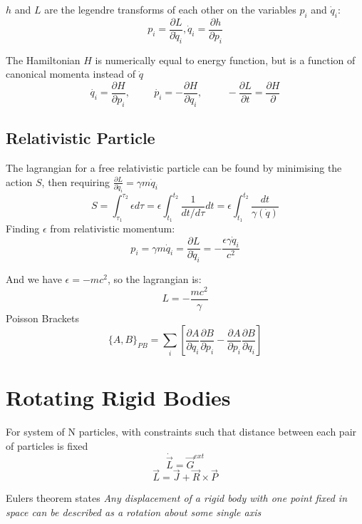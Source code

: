 \documentclass[table,cmyk]{article}
\begin{document}
\begin{longtable}
  
  $h$ and $L$ are the legendre transforms of each other on the variables $p_i$
  and $\dot q_i$:
  \begin{displaymath}
    p_i=\frac{\partial L}{\partial \dot q_i}, \dot q_i = \frac{\partial
      h}{\partial p_i}
  \end{displaymath}
  
The Hamiltonian $H$ is numerically equal to energy function, but is a function of canonical momenta instead of $\dot{q}$
\[ \dot{q_i} = \frac{\partial H}{\partial p_i}, \hspace{1cm} \dot{p_i} = -\frac{\partial H}{\partial q_i}, \hspace{1cm} -\frac{\partial L}{\partial t} = \frac{\partial H}{\partial }\]
  \subsection*{Relativistic Particle}
  The lagrangian for a free relativistic particle can be found by minimising the
  action $S$, then requiring $\frac{\partial L}{\partial \dot q_i}=\gamma m \dot
  q_i$
  \begin{displaymath}
   S=
   \int_{\tau_1}^{\tau_2}\epsilon d\tau=\epsilon\int_{t_1}^{t_2}\frac{1}{dt/d\tau}dt
    =\epsilon\int_{t_1}^{t_2}\frac{dt}{\gamma(\dot q)}
  \end{displaymath}
    \tabularnewline\hline
  Finding $\epsilon$ from relativistic momentum:
  \begin{displaymath}
    p_i=\gamma m \dot q_i=\frac{\partial L}{\partial \dot
      q_i}=-\frac{\epsilon\gamma\dot q_i}{c^2}
  \end{displaymath}

  And we have $\epsilon = -mc^2$, so the lagrangian is:
  \begin{displaymath}
   L=-\frac{mc^2}{\gamma} 
  \end{displaymath}
Poisson Brackets
\[\{ A, B \}_{PB} = \sum_{i} \left[ \frac{\partial A}{\partial q_i} \frac{\partial B}{\partial p_i} - \frac{\partial A}{\partial p_i}\frac{\partial B}{\partial q_i}\right]\]
\section*{Rotating Rigid Bodies}
For system of N particles, with constraints such that distance between each pair of particles is fixed
\[ \dot{\vec{L}} = \vec{G}^{ext}\]
\[ \vec{L} = \vec{J} + \vec{R} \times \vec{P}\]

Eulers theorem states \textit{Any displacement of a rigid body with one point fixed in space can be described as a rotation about some single axis}


\end{longtable}
\end{document}
